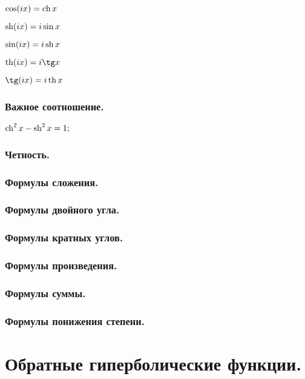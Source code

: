$\cos (ix) = \mathop{\rm ch}\nolimits x$

$\mathop{\rm sh}\nolimits (ix)= i \sin x$

$\sin (ix) = i \mathop{\rm sh}\nolimits x$

$\th (ix) = i \tg x$

$\tg (ix) = i \th x$

\subsubsection{Важное соотношение.}
$\mathop{\rm ch}\nolimits^2 x - \mathop{\rm sh}\nolimits^2 x = 1;$

\subsubsection{Четность.}

\subsubsection{Формулы сложения.}

\subsubsection{Формулы двойного угла.}

\subsubsection{Формулы кратных углов.}

\subsubsection{Формулы произведения.}

\subsubsection{Формулы суммы.}

\subsubsection{Формулы понижения степени.}

\section{Обратные гиперболические функции.}


